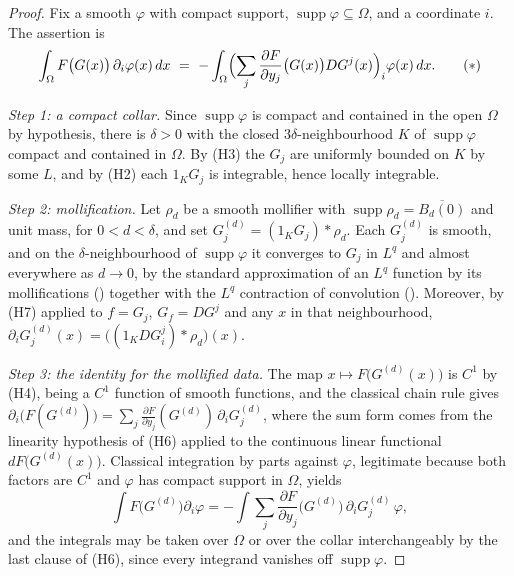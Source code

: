 \begin{proof}
Fix a smooth $\varphi$ with compact support, $\operatorname{supp}\varphi\subseteq\Omega$,
and a coordinate $i$.  The assertion is
\[
\int_\Omega F\bigl(G(x)\bigr)\,\partial_i\varphi(x)\,dx
\ =\ -\int_\Omega\Bigl(\sum_j\frac{\partial F}{\partial y_j}\bigl(G(x)\bigr)DG^j(x)\Bigr)_i\varphi(x)\,dx .
\tag{$\ast$}
\]

\emph{Step 1: a compact collar.}  Since $\operatorname{supp}\varphi$ is compact
and contained in the open $\Omega$ by hypothesis, there is $\delta>0$ with the
closed $3\delta$-neighbourhood $K$ of $\operatorname{supp}\varphi$ compact and
contained in $\Omega$.  By (H3) the $G_j$ are uniformly bounded on $K$ by some
$L$, and by (H2) each $1_KG_j$ is integrable, hence locally integrable.

\emph{Step 2: mollification.}  Let $\rho_d$ be a smooth mollifier with
$\operatorname{supp}\rho_d=\overline{B_d(0)}$ and unit mass, for
$0<d<\delta$, and set $G^{(d)}_j=(1_KG_j)*\rho_d$.  Each $G^{(d)}_j$ is smooth,
and on the $\delta$-neighbourhood of $\operatorname{supp}\varphi$ it converges
to $G_j$ in $L^q$ and almost everywhere as $d\to0$, by the standard
approximation of an $L^q$ function by its mollifications
() together with the $L^q$ contraction of
convolution ().  Moreover, by (H7) applied to
$f=G_j$, $G_f=DG^j$ and any $x$ in that neighbourhood,
$\partial_iG^{(d)}_j(x)=\bigl((1_KDG^j_i)*\rho_d\bigr)(x)$.

\emph{Step 3: the identity for the mollified data.}  The map
$x\mapsto F\bigl(G^{(d)}(x)\bigr)$ is $C^1$ by (H4), being a $C^1$ function of
smooth functions, and the classical chain rule gives
$\partial_i\bigl(F(G^{(d)})\bigr)=\sum_j\frac{\partial F}{\partial y_j}(G^{(d)})\,\partial_iG^{(d)}_j$,
where the sum form comes from the linearity hypothesis of (H6) applied to the
continuous linear functional $dF\bigl(G^{(d)}(x)\bigr)$.  Classical integration
by parts against $\varphi$, legitimate because both factors are $C^1$ and
$\varphi$ has compact support in $\Omega$, yields
\[
\int F\bigl(G^{(d)}\bigr)\partial_i\varphi
=-\int\sum_j\frac{\partial F}{\partial y_j}\bigl(G^{(d)}\bigr)\,\partial_iG^{(d)}_j\,\varphi ,
\]
and the integrals may be taken over $\Omega$ or over the collar
interchangeably by the last clause of (H6), since every integrand vanishes off
$\operatorname{supp}\varphi$.


\end{proof}

